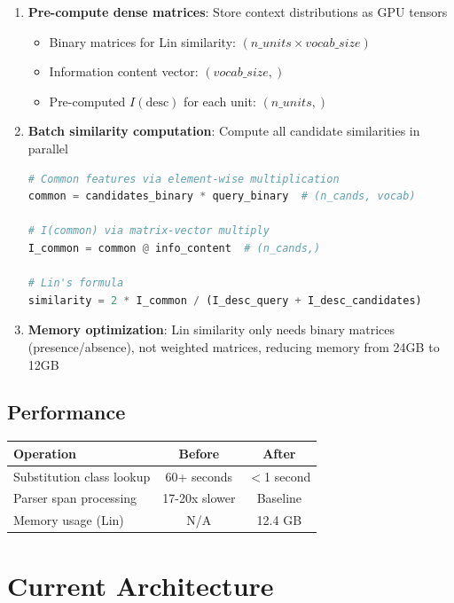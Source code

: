 \documentclass[11pt,a4paper]{article}
\begin{document}
\begin{enumerate}
    \item \textbf{Pre-compute dense matrices}: Store context distributions as GPU tensors
    \begin{itemize}
        \item Binary matrices for Lin similarity: $(n\_units \times vocab\_size)$
        \item Information content vector: $(vocab\_size,)$
        \item Pre-computed $I(\text{desc})$ for each unit: $(n\_units,)$
    \end{itemize}

    \item \textbf{Batch similarity computation}: Compute all candidate similarities in parallel
    \begin{lstlisting}[language=Python]
# Common features via element-wise multiplication
common = candidates_binary * query_binary  # (n_cands, vocab)

# I(common) via matrix-vector multiply
I_common = common @ info_content  # (n_cands,)

# Lin's formula
similarity = 2 * I_common / (I_desc_query + I_desc_candidates)
    \end{lstlisting}

    \item \textbf{Memory optimization}: Lin similarity only needs binary matrices (presence/absence), not weighted matrices, reducing memory from 24GB to 12GB
\end{enumerate}

\subsection{Performance}

\begin{center}
\begin{tabular}{|l|c|c|}
\hline
\textbf{Operation} & \textbf{Before} & \textbf{After} \\
\hline
Substitution class lookup & 60+ seconds & $<$1 second \\
\hline
Parser span processing & 17-20x slower & Baseline \\
\hline
Memory usage (Lin) & N/A & 12.4 GB \\
\hline
\end{tabular}
\end{center}

\section{Current Architecture}
\end{document}
